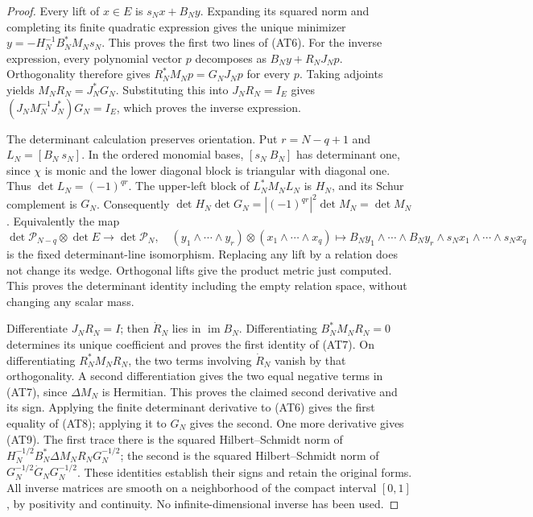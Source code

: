 \documentclass[11pt]{article}
\newcommand{\im}{\operatorname{im}}
\newcommand{\cP}{\mathcal P}
\begin{document}
\begin{proof}
Every lift of $x\in E$ is $s_Nx+B_Ny$. Expanding its squared norm
and completing its finite quadratic expression gives the unique
minimizer $y=-H_N^{-1}B_N^*M_Ns_N$. This proves the first two
lines of (AT6). For the inverse expression, every polynomial vector
$p$ decomposes as $B_Ny+R_NJ_Np$. Orthogonality therefore gives
$R_N^*M_Np=G_NJ_Np$ for every $p$. Taking adjoints yields
$M_NR_N=J_N^*G_N$. Substituting this into $J_NR_N=I_E$ gives
$(J_NM_N^{-1}J_N^*)G_N=I_E$, which proves the inverse expression.

The determinant calculation preserves orientation. Put
$r=N-q+1$ and $L_N=[B_N\ s_N]$. In the ordered monomial bases,
$[s_N\ B_N]$ has determinant one, since $\chi$ is monic and the
lower diagonal block is triangular with diagonal one. Thus
$\det L_N=(-1)^{qr}$. The upper-left block of $L_N^*M_NL_N$
is $H_N$, and its Schur complement is $G_N$. Consequently
$\det H_N\det G_N=|(-1)^{qr}|^2\det M_N=\det M_N$.
Equivalently the map
\[
 \det\cP_{N-q}\otimes\det E\longrightarrow\det\cP_N,
 \quad (y_1\wedge\cdots\wedge y_r)\otimes(x_1\wedge\cdots\wedge x_q)
 \longmapsto
 B_Ny_1\wedge\cdots\wedge B_Ny_r\wedge s_Nx_1\wedge\cdots\wedge s_Nx_q
                                                        \tag{AT10}
\]
is the fixed determinant-line isomorphism. Replacing any lift by a
relation does not change its wedge. Orthogonal lifts give the product
metric just computed. This proves the determinant identity including
the empty relation space, without changing any scalar mass.

Differentiate $J_NR_N=I$; then $\dot R_N$ lies in $\im B_N$.
Differentiating $B_N^*M_NR_N=0$ determines its unique coefficient
and proves the first identity of (AT7). On differentiating
$R_N^*M_NR_N$, the two terms involving $\dot R_N$ vanish by
that orthogonality. A second differentiation gives the two equal
negative terms in (AT7), since $\Delta M_N$ is Hermitian. This
proves the claimed second derivative and its sign. Applying the
finite determinant derivative to (AT6) gives the first equality
of (AT8); applying it to $G_N$ gives the second.
One more derivative gives (AT9). The first trace there is the squared
Hilbert--Schmidt norm of
$H_N^{-1/2}B_N^*\Delta M_NR_NG_N^{-1/2}$; the second is the
squared Hilbert--Schmidt norm of
$G_N^{-1/2}\dot G_NG_N^{-1/2}$. These identities establish their
signs and retain the original forms. All inverse matrices are smooth
on a neighborhood of the compact interval $[0,1]$, by positivity
and continuity. No infinite-dimensional inverse has been used.
\end{proof}
\end{document}
